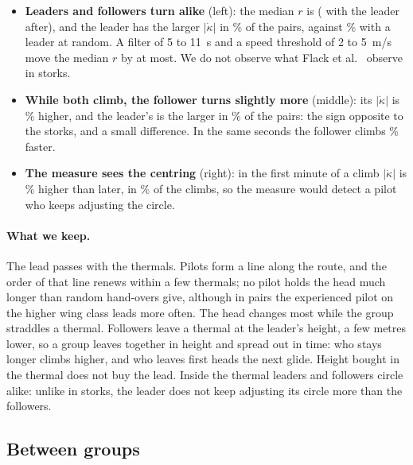 \begin{itemize}
  \item \textbf{Leaders and followers turn alike} (left): the median $r$ is \StCuR{} \StCuRBand{}
        (\StCuAfterR{} \StCuAfterRBand{} with the leader after), and the leader has the larger
        $|\dot\kappa|$ in \StCuShare\% \StCuShareBand{} of the pairs, against \StCuShareRandom\%
        with a leader at random. A filter of 5 to 11~s and a speed threshold of 2 to 5~m/s move the
        median $r$ by \StCuSensMax{} at most. We do not observe what Flack et
        al.~\cite{flack2018} observe in storks.
  \item \textbf{While both climb, the follower turns slightly more} (middle): its $|\dot\kappa|$ is
        \StCuCommon\% \StCuCommonBand{} higher, and the leader's is the larger in
        \StCuCommonShare\% of the pairs: the sign opposite to the storks, and a small difference.
        In the same seconds the follower climbs \StCuClimbCommon\% \StCuClimbCommonBand{} faster.
  \item \textbf{The measure sees the centring} (right): in the first minute of a climb
        $|\dot\kappa|$ is \StCuFirst\% \StCuFirstBand{} higher than later, in \StCuFirstShare\% of
        the climbs, so the measure would detect a pilot who keeps adjusting the circle.
\end{itemize}
\paragraph{What we keep.} The lead passes with the thermals. Pilots form a line along the route,
and the order of that line renews within a few thermals; no pilot holds the head much longer than
random hand-overs give, although in pairs the experienced pilot on the higher wing class leads
more often. The head changes most while the group straddles a thermal. Followers leave a thermal at
the leader's height, a few metres lower, so a group leaves together in height and spread out in
time: who stays longer climbs higher, and who leaves first heads the next glide. Height bought in
the thermal does not buy the lead. Inside the thermal leaders and followers circle alike: unlike in
storks, the leader does not keep adjusting its circle more than the followers.

\subsection{Between groups}\label{sec:between}

